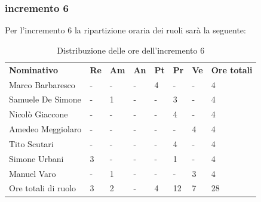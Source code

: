 \subsubsection{incremento 6}
Per l'incremento 6 la ripartizione oraria dei ruoli sarà la seguente:
\begin{center}
    \begin{table}[ht!]
        \centering
        \caption{Distribuzione delle ore dell'incremento 6}
        \vspace{5px}
        \renewcommand{\arraystretch}{1.8}
        \begin{tabular}{p{100px} p{20px} p{20px} p{20px} p{20px} p{20px} p{20px} p{50px} }
            \rowcolor{logo!70} \textbf{Nominativo} & \textbf{Re} & \textbf{Am} & \textbf{An} & \textbf{Pt} & \textbf{Pr} & \textbf{Ve} & \textbf{Ore totali} \\
            Marco Barbaresco                       & -           & -           & -           & 4           & -           & -           & 4                   \\
            Samuele De Simone                      & -           & 1           & -           & -           & 3           & -           & 4                   \\
            Nicolò Giaccone                        & -           & -           & -           & -           & 4           & -           & 4                   \\
            Amedeo Meggiolaro                      & -           & -           & -           & -           & -           & 4           & 4                   \\
            Tito Scutari                           & -           & -           & -           & -           & 4           & -           & 4                   \\
            Simone Urbani                          & 3           & -           & -           & -           & 1           & -           & 4                   \\
            Manuel Varo                            & -           & 1           & -           & -           & -           & 3           & 4                   \\
            Ore totali di ruolo                    & 3           & 2           & -           & 4           & 12          & 7           & 28                  \\
        \end{tabular}
    \end{table}
\end{center}
